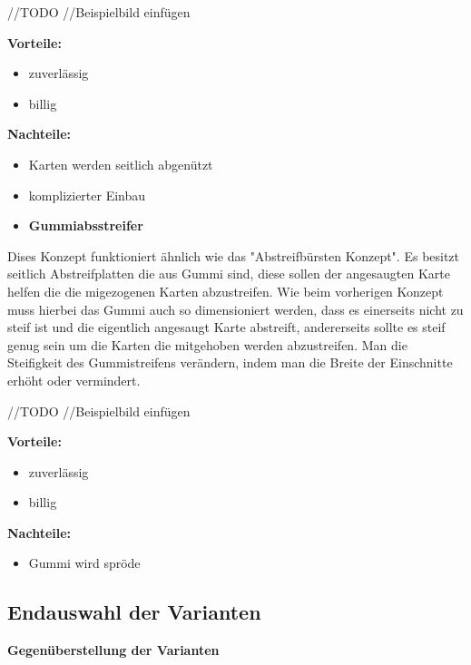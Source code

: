 //TODO
//Beispielbild einfügen

\textbf{Vorteile:}
\begin{itemize}
    \item zuverlässig
    \item billig
\end{itemize}
\textbf{Nachteile:}
\begin{itemize}
    \item Karten werden seitlich abgenützt
    \item komplizierter Einbau
\end{itemize}

\begin{itemize}
    \item \textbf{Gummiabsstreifer}
\end{itemize}

Dises Konzept funktioniert ähnlich wie das "Abstreifbürsten Konzept". Es besitzt seitlich Abstreifplatten die aus Gummi sind, diese
sollen der angesaugten Karte helfen die die migezogenen Karten abzustreifen. Wie beim vorherigen Konzept muss hierbei das Gummi auch so
dimensioniert werden, dass es einerseits nicht zu steif ist und die eigentlich angesaugt Karte abstreift, andererseits sollte es steif genug
sein um die Karten die mitgehoben werden abzustreifen. Man die Steifigkeit des Gummistreifens verändern, indem man die Breite der Einschnitte
erhöht oder vermindert.

//TODO
//Beispielbild einfügen

\textbf{Vorteile:}
\begin{itemize}
    \item zuverlässig
    \item billig
\end{itemize}
\textbf{Nachteile:}
\begin{itemize}
    \item Gummi wird spröde
\end{itemize}

\subsection{Endauswahl der Varianten}

\textbf{\large{Gegenüberstellung der Varianten}}

